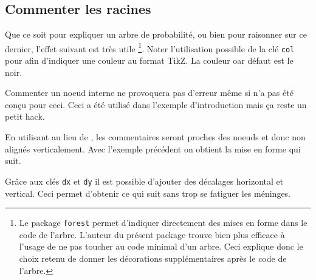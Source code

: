 \documentclass[12pt,a4paper]{article}
\begin{document}

\subsection{Commenter les racines}


Que ce soit pour expliquer un arbre de probabilité, ou bien pour raisonner sur ce dernier, l'effet suivant est très utile
\footnote{
	Le package \texttt{forest} permet d'indiquer directement des mises en forme dans le code de l'arbre.
	L'auteur du présent package trouve bien plus efficace à l'usage de ne pas toucher au code minimal d'un arbre.
	Ceci explique donc le choix retenu de donner les décorations supplémentaires après le code de l'arbre.
}.
Noter l'utilisation possible de la clé \verb#col# pour  afin d'indiquer une couleur au format TikZ.
La couleur oar défaut est le noir. 




\begin{remark}
	Commenter un noeud interne ne provoquera pas d'erreur même si  n'a pas été conçu pour ceci.
	Ceci a été utilisé dans l'exemple d'introduction mais ça reste un petit hack.
\end{remark}





En utilisant  au lieu de , les commentaires seront proches des noeuds et donc non alignés verticalement. 
Avec l'exemple précédent on obtient la mise en forme qui suit.

\medskip







Grâce aux clés \verb#dx# et \verb#dy# il est possible d'ajouter des décalages horizontal et vertical. Ceci permet d'obtenir ce qui suit sans trop se fatiguer les méninges.


\end{document}
